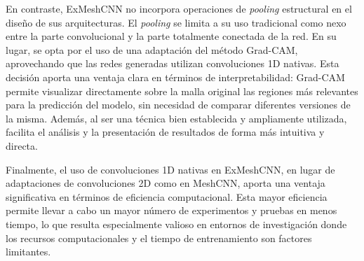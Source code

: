 En contraste, ExMeshCNN no incorpora operaciones de \textit{pooling} estructural en el diseño de sus arquitecturas. El \textit{pooling} se limita a su uso tradicional como nexo entre la parte convolucional y la parte totalmente conectada de la red. En su lugar, se opta por el uso de una adaptación del método Grad-CAM, aprovechando que las redes generadas utilizan convoluciones 1D nativas. Esta decisión aporta una ventaja clara en términos de interpretabilidad: Grad-CAM permite visualizar directamente sobre la malla original las regiones más relevantes para la predicción del modelo, sin necesidad de comparar diferentes versiones de la misma. Además, al ser una técnica bien establecida y ampliamente utilizada, facilita el análisis y la presentación de resultados de forma más intuitiva y directa.

Finalmente, el uso de convoluciones 1D nativas en ExMeshCNN, en lugar de adaptaciones de convoluciones 2D como en MeshCNN, aporta una ventaja significativa en términos de eficiencia computacional. Esta mayor eficiencia permite llevar a cabo un mayor número de experimentos y pruebas en menos tiempo, lo que resulta especialmente valioso en entornos de investigación donde los recursos computacionales y el tiempo de entrenamiento son factores limitantes.